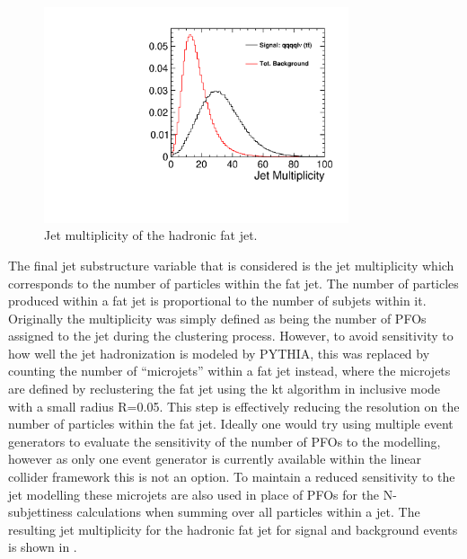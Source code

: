 \begin{figure}
  \centering
  \includegraphics[width=0.8\textwidth]{TopAnalysis/figures/JetMultiplicity.pdf}
  \caption[Jet multiplicity of the hadronic fat jet]{Jet multiplicity of the hadronic fat jet.}
  \label{fig:multiplicity}
\end{figure}


The final jet substructure variable that is considered is the jet multiplicity which corresponds to the number of particles within the fat jet. The number of particles produced within a fat jet is proportional to the number of subjets within it. Originally the multiplicity was simply defined as being the number of \ac{PFO}s assigned to the jet during the clustering process. However, to avoid sensitivity to how well the jet hadronization is modeled by PYTHIA, this was replaced by counting the number of ``microjets'' within a fat jet instead, where the microjets are defined by reclustering the fat jet using the kt algorithm in inclusive mode with a small radius R=0.05. This step is effectively reducing the resolution on the number of particles within the fat jet. Ideally one would try using multiple event generators to evaluate the sensitivity of the number of PFOs to the modelling, however as only one event generator is currently available within the linear collider framework this is not an option. To maintain a reduced sensitivity to the jet modelling these microjets are also used in place of PFOs for the N-subjettiness calculations when summing over all particles within a jet. The resulting jet multiplicity for the hadronic fat jet for signal and background events is shown in .


